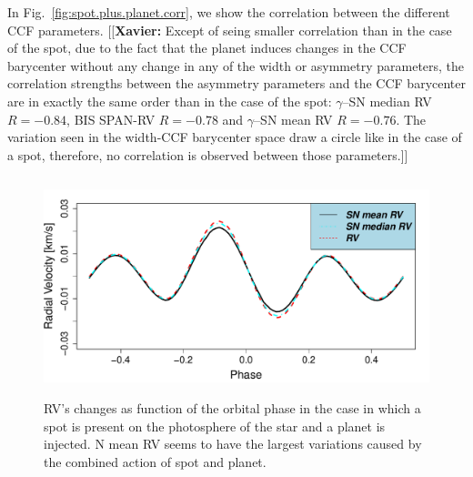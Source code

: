 \documentclass[11pt, oneside]{article}
\newcommand{\xavier}[1]{{\color{blue}[[\textbf{Xavier: }#1]]}}
\begin{document}
In Fig.~\ref{fig:spot.plus.planet.corr}, we show the correlation between the different CCF parameters. \xavier{Except of seing smaller correlation than in the case of the spot, due to the fact that the planet induces changes in the CCF barycenter without any change in any of the width or asymmetry parameters, the correlation strengths between the asymmetry parameters and the CCF barycenter are in exactly the same order than in the case of the spot: $\gamma$--SN median RV $R=-0.84$, BIS SPAN-RV $R=-0.78$ and $\gamma$--SN mean RV $R=-0.76$. The variation seen in the width-CCF barycenter space draw a circle like in the case of a spot, therefore, no correlation is observed between those parameters.}

\begin{figure}[htbp]
   \centering
\includegraphics[height = 2.5in]{RV_comparison_SPOT_PLANET.pdf} 
 \caption{RV's changes as function of the orbital phase in the case in which a spot is present on the photosphere of the star and a planet is injected. N mean RV seems to have the largest variations caused by the combined action of spot and planet.}
    \label{fig:spot.plus.planet}
\end{figure}
\end{document}
